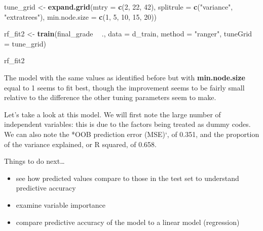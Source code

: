 \documentclass[]{book}
\newenvironment{Shaded}{\begin{snugshade}}{\end{snugshade}}
\newcommand{\KeywordTok}[1]{\textcolor[rgb]{0.13,0.29,0.53}{\textbf{#1}}}
\newcommand{\DataTypeTok}[1]{\textcolor[rgb]{0.13,0.29,0.53}{#1}}
\newcommand{\DecValTok}[1]{\textcolor[rgb]{0.00,0.00,0.81}{#1}}
\newcommand{\StringTok}[1]{\textcolor[rgb]{0.31,0.60,0.02}{#1}}
\newcommand{\OperatorTok}[1]{\textcolor[rgb]{0.81,0.36,0.00}{\textbf{#1}}}
\newcommand{\NormalTok}[1]{#1}
\providecommand{\tightlist}{%
  \setlength{\itemsep}{0pt}\setlength{\parskip}{0pt}}
\begin{document}
\begin{Shaded}
\begin{Highlighting}[]
\NormalTok{tune_grid <-}\StringTok{ }\KeywordTok{expand.grid}\NormalTok{(}\DataTypeTok{mtry =} \KeywordTok{c}\NormalTok{(}\DecValTok{2}\NormalTok{, }\DecValTok{22}\NormalTok{, }\DecValTok{42}\NormalTok{),}
                         \DataTypeTok{splitrule =} \KeywordTok{c}\NormalTok{(}\StringTok{"variance"}\NormalTok{, }\StringTok{"extratrees"}\NormalTok{),}
                         \DataTypeTok{min.node.size =} \KeywordTok{c}\NormalTok{(}\DecValTok{1}\NormalTok{, }\DecValTok{5}\NormalTok{, }\DecValTok{10}\NormalTok{, }\DecValTok{15}\NormalTok{, }\DecValTok{20}\NormalTok{))}

\NormalTok{rf_fit2 <-}\StringTok{ }\KeywordTok{train}\NormalTok{(final_grade }\OperatorTok{~}\StringTok{ }\NormalTok{.,}
                \DataTypeTok{data =}\NormalTok{ d_train,}
                \DataTypeTok{method =} \StringTok{"ranger"}\NormalTok{,}
                \DataTypeTok{tuneGrid =}\NormalTok{ tune_grid)}

\NormalTok{rf_fit2}
\end{Highlighting}
\end{Shaded}

The model with the same values as identified before but with
\textbf{min.node.size} equal to 1 seems to fit best, though the
improvement seems to be fairly small relative to the difference the
other tuning parameters seem to make.

Let's take a look at this model. We will first note the large number of
independent variables: this is due to the factors being treated as dummy
codes. We can also note the *OOB prediction error (MSE)`, of 0.351, and
the proportion of the variance explained, or R squared, of 0.658.

\begin{Shaded}
\end{Shaded}

Things to do next\ldots{}

\begin{itemize}
\tightlist
\item
  see how predicted values compare to those in the test set to
  understand predictive accuracy
\item
  examine variable importance
\item
  compare predictive accuracy of the model to a linear model
  (regression)
\end{itemize}
\end{document}
